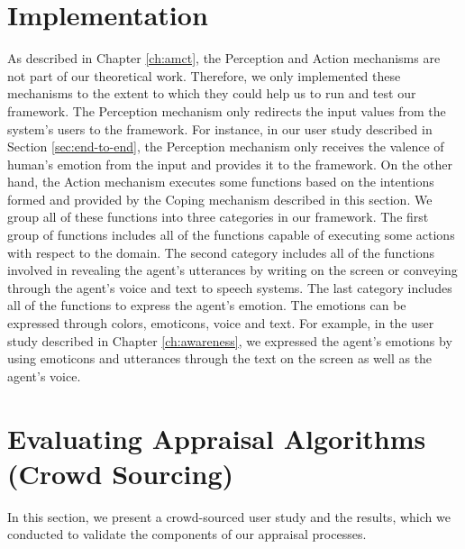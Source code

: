 \documentclass[12pt]{report}
\begin{document}
\section{Implementation}
As described in Chapter \ref{ch:amct}, the Perception and Action mechanisms are
not part of our theoretical work. Therefore, we only implemented these
mechanisms to the extent to which they could help us to run and test our
framework. The Perception mechanism only redirects the input values from the
system's users to the framework. For instance, in our user study described in
Section \ref{sec:end-to-end}, the Perception mechanism only receives the valence
of human's emotion from the input and provides it to the framework.
On the other hand, the Action mechanism executes some functions based on the
intentions formed and provided by the Coping mechanism described in this
section. We group all of these functions into three categories in our framework.
The first group of functions includes all of the functions capable of executing
some actions with respect to the domain. The second category includes all of the
functions involved in revealing the agent's utterances by writing on the screen or
conveying through the agent's voice and text to speech systems. The last
category includes all of the functions to express the agent's emotion. The
emotions can be expressed through colors, emoticons, voice and text. For
example, in the user study described in Chapter \ref{ch:awareness}, we expressed
the agent's emotions by using emoticons and utterances through the text on the
screen as well as the agent's voice.

\section{Evaluating Appraisal Algorithms (Crowd Sourcing)}
\label{sec:crowd-sourcing}
In this section, we present a crowd-sourced user study and the results, which
we conducted to validate the components of our appraisal processes.
\end{document}
